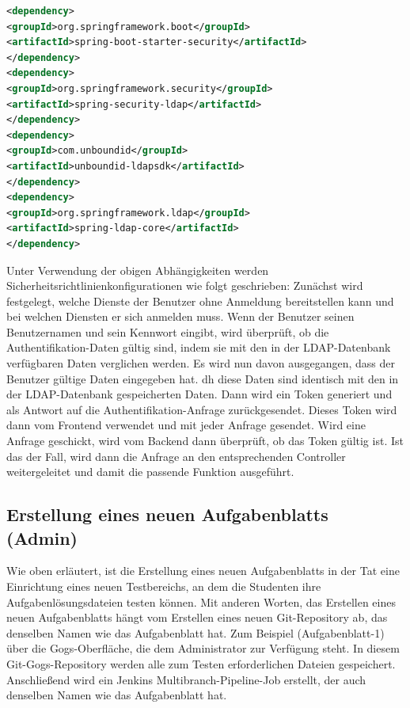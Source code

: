 \documentclass[a4paper,12pt,oneside]{book}
\begin{document}
\begin{lstlisting}[language=XML,caption=pom.xml - security dependencies]
<dependency>
<groupId>org.springframework.boot</groupId>
<artifactId>spring-boot-starter-security</artifactId>
</dependency>
<dependency>
<groupId>org.springframework.security</groupId>
<artifactId>spring-security-ldap</artifactId>
</dependency>
<dependency>
<groupId>com.unboundid</groupId>
<artifactId>unboundid-ldapsdk</artifactId>
</dependency>
<dependency>
<groupId>org.springframework.ldap</groupId>
<artifactId>spring-ldap-core</artifactId>
</dependency>
\end{lstlisting}
Unter Verwendung der obigen Abhängigkeiten werden Sicherheitsrichtlinienkonfigurationen wie folgt geschrieben: Zunächst wird festgelegt, welche Dienste der Benutzer ohne Anmeldung bereitstellen kann und bei welchen Diensten er sich anmelden muss. Wenn der Benutzer seinen Benutzernamen und sein Kennwort eingibt, wird überprüft, ob die Authentifikation-Daten gültig sind, indem sie mit den in der LDAP-Datenbank verfügbaren Daten verglichen werden.
\newline
Es wird nun davon ausgegangen, dass der Benutzer gültige Daten eingegeben hat. dh diese Daten sind identisch mit den in der LDAP-Datenbank gespeicherten Daten. Dann wird ein Token generiert und als Antwort auf die Authentifikation-Anfrage zurückgesendet. Dieses Token wird dann vom Frontend verwendet und mit jeder Anfrage gesendet.
\newline
Wird eine Anfrage geschickt, wird vom Backend dann überprüft, ob das Token gültig ist. Ist das der Fall, wird dann die Anfrage an den entsprechenden Controller weitergeleitet und damit die passende Funktion ausgeführt.


\subsection{Erstellung eines neuen Aufgabenblatts (Admin)}
Wie oben erläutert, ist die Erstellung eines neuen Aufgabenblatts in der Tat eine Einrichtung eines neuen Testbereichs, an dem die Studenten ihre Aufgabenlösungsdateien testen können. Mit anderen Worten, das Erstellen eines neuen Aufgabenblatts hängt vom Erstellen eines neuen Git-Repository ab, das denselben Namen wie das Aufgabenblatt hat. Zum Beispiel (Aufgabenblatt-1) über die Gogs-Oberfläche, die dem Administrator zur Verfügung steht. In diesem Git-Gogs-Repository werden alle zum Testen erforderlichen Dateien gespeichert. Anschließend wird ein Jenkins Multibranch-Pipeline-Job erstellt, der auch denselben Namen wie das Aufgabenblatt hat.
\end{document}
